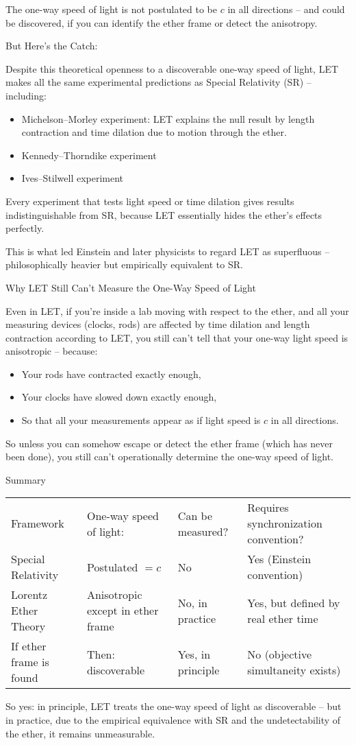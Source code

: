 \documentclass[a4paper]{article}
\theoremstyle{plain}
\theoremstyle{definition}
\begin{document}
The one-way speed of light is not postulated to be $c$ in all
directions -- and could be discovered, if you can identify the ether
frame or detect the anisotropy.

But Here’s the Catch:

Despite this theoretical openness to a discoverable one-way speed of
light, LET makes all the same experimental predictions as Special
Relativity (SR) -- including:
\begin{itemize}
\item Michelson–Morley experiment: LET explains the null result by
  length contraction and time dilation due to motion through the
  ether.
\item Kennedy–Thorndike experiment
\item Ives–Stilwell experiment
\end{itemize}

Every experiment that tests light speed or time dilation gives results
indistinguishable from SR, because LET essentially hides the ether’s
effects perfectly.

This is what led Einstein and later physicists to regard LET as
superfluous -- philosophically heavier but empirically equivalent to
SR.

Why LET Still Can’t Measure the One-Way Speed of Light

Even in LET, if you're inside a lab moving with respect to the ether,
and all your measuring devices (clocks, rods) are affected by time
dilation and length contraction according to LET, you still can’t tell
that your one-way light speed is anisotropic -- because:
\begin{itemize}
\item Your rods have contracted exactly enough,
\item Your clocks have slowed down exactly enough,
\item So that all your measurements appear as if light speed is $c$ in
  all directions.
\end{itemize}
So unless you can somehow escape or detect the ether frame (which has
never been done), you still can’t operationally determine the one-way
speed of light.

Summary

\begin{tabularx}{1.0\textwidth}{|p{3.4cm}|p{3.7cm}|p{2.8cm}|p{3.6cm}|}
\cline{1-4} \\
Framework & One-way speed of light: & Can be measured? & Requires synchronization convention?
\\ \cline{1-4}
Special Relativity & Postulated $= c$ & No & Yes (Einstein convention)
\\ \cline{1-4}
Lorentz Ether Theory & Anisotropic except in ether frame & No, in practice & Yes, but defined by real ether time
\\ \cline{1-4}
If ether frame is found & Then: discoverable & Yes, in principle & No (objective simultaneity exists)
\\ \cline{1-4}
\end{tabularx}
So yes: in principle, LET treats the one-way speed of light as
discoverable -- but in practice, due to the empirical equivalence with
SR and the undetectability of the ether, it remains unmeasurable.
\end{document}

